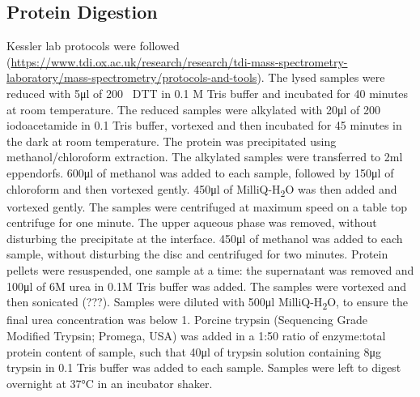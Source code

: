 \subsection{Protein Digestion}
Kessler lab protocols were followed (\url{https://www.tdi.ox.ac.uk/research/research/tdi-mass-spectrometry-laboratory/mass-spectrometry/protocols-and-tools}).
The lysed samples were reduced with 5\si{\ul} of 200\si{\milli\Molar} DTT in 0.1 M Tris buffer and incubated for 40 minutes at room temperature.
The reduced samples were alkylated with 20\si{\ul} of 200\si{\milli\Molar} iodoacetamide in 0.1\si{\Molar} Tris buffer, vortexed and then incubated for 45 minutes in the dark at room temperature.
The protein was precipitated using methanol/chloroform extraction.
The alkylated samples were transferred to 2ml eppendorfs.
600\si{\ul} of methanol was added to each sample, followed by 150\si{\ul} of chloroform and then vortexed gently.
450\si{\ul} of MilliQ-H\textsubscript{2}O was then added and vortexed gently.
The samples were centrifuged at maximum speed on a table top centrifuge for one minute.
The upper aqueous phase was removed, without disturbing the precipitate at the interface.
450\si{\ul} of methanol was added to each sample, without disturbing the disc and centrifuged for two minutes.
Protein pellets were resuspended, one sample at a time: the supernatant was removed and 100\si{\ul} of 6M urea in 0.1M Tris buffer was added.
The samples were vortexed and then sonicated (???).
Samples were diluted with 500\si{\ul} MilliQ-H\textsubscript{2}O, to ensure the final urea concentration was below 1\si{\Molar}.
Porcine trypsin (Sequencing Grade Modified Trypsin; Promega, USA) was added in a 1:50 ratio of enzyme:total protein content of sample, such that 40\si{\ul} of trypsin solution containing 8\si{\ug} trypsin in 0.1\si{\Molar} Tris buffer was added to each sample.
Samples were left to digest overnight at 37\si{\degreeCelsius} in an incubator shaker.

